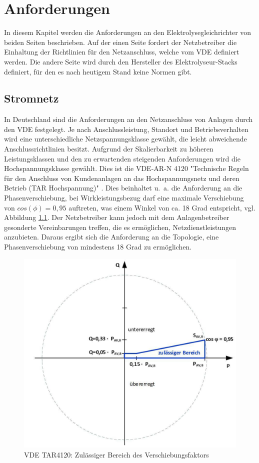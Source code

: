 \chapter{Anforderungen}
\label{chap:Anforderungen}
In diesem Kapitel werden die Anforderungen an den Elektrolysegleichrichter von beiden Seiten beschrieben. Auf der einen Seite fordert der Netzbetreiber die Einhaltung der Richtlinien für den Netzanschluss, welche vom \gls{VDE} definiert werden. Die andere Seite wird durch den Hersteller des Elektrolyseur-Stacks definiert, für den es nach heutigem Stand keine Normen gibt. 
\section {Stromnetz} \label{sec:AnfStromnetz}
In Deutschland sind die Anforderungen an den Netzanschluss von Anlagen durch den \gls{VDE} festgelegt. Je nach Anschlussleistung, Standort und Betriebsverhalten wird eine unterschiedliche Netzspannungsklasse gewählt, die leicht abweichende Anschlussrichtlinien besitzt. Aufgrund der Skalierbarkeit zu höheren Leistungsklassen und den zu erwartenden steigenden Anforderungen wird die Hochspannungsklasse gewählt. Dies ist die VDE-AR-N 4120 "Technische Regeln für den Anschluss von Kundenanlagen an das Hochspannungsnetz und deren Betrieb (TAR Hochspannung)" \cite{VDEARN4120}.
Dies beinhaltet u.~a. die Anforderung an die Phasenverschiebung, bei Wirkleistungsbezug darf eine maximale Verschiebung von $cos(\phi)=0,95$ auftreten, was einem Winkel von ca. 18 Grad entspricht, vgl. Abbildung \ref{fig:tar4120pq}. Der Netzbetreiber kann jedoch mit dem Anlagenbetreiber gesonderte Vereinbarungen treffen, die es ermöglichen, Netzdienstleistungen anzubieten. Daraus ergibt sich die Anforderung an die Topologie, eine Phasenverschiebung von mindestens 18 Grad zu ermöglichen.\\
\begin{figure}
	\centering
	\includegraphics[width=0.6\linewidth]{content/Grafiken/TAR4120_PQ}
	\caption[Zulässiger Bereich des Verschiebungsfaktors cos $\phi$ bei Wirkleistungsbezug]{VDE TAR4120: Zulässiger Bereich des Verschiebungsfaktors \cite{VDEARN4120}}
	\label{fig:tar4120pq}
\end{figure}

